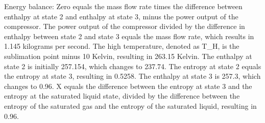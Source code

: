 Energy balance:
Zero equals the mass flow rate times the difference between enthalpy at state 2 and enthalpy at state 3, minus the power output of the compressor.
The power output of the compressor divided by the difference in enthalpy between state 2 and state 3 equals the mass flow rate, which results in 1.145 kilograms per second.
The high temperature, denoted as T_H, is the sublimation point minus 10 Kelvin, resulting in 263.15 Kelvin.
The enthalpy at state 2 is initially 257.154, which changes to 237.74.
The entropy at state 2 equals the entropy at state 3, resulting in 0.5258.
The enthalpy at state 3 is 257.3, which changes to 0.96.
X equals the difference between the entropy at state 3 and the entropy at the saturated liquid state, divided by the difference between the entropy of the saturated gas and the entropy of the saturated liquid, resulting in 0.96.